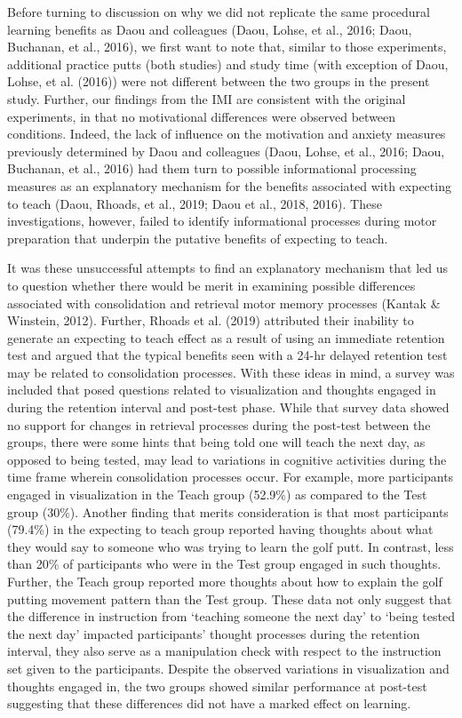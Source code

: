 \documentclass[
  english,
  man,floatsintext]{apa7}
\begin{document}
Before turning to discussion on why we did not replicate the same procedural learning benefits as Daou and colleagues (Daou, Lohse, et al., 2016; Daou, Buchanan, et al., 2016), we first want to note that, similar to those experiments, additional practice putts (both studies) and study time (with exception of Daou, Lohse, et al. (2016)) were not different between the two groups in the present study. Further, our findings from the IMI are consistent with the original experiments, in that no motivational differences were observed between conditions. Indeed, the lack of influence on the motivation and anxiety measures previously determined by Daou and colleagues (Daou, Lohse, et al., 2016; Daou, Buchanan, et al., 2016) had them turn to possible informational processing measures as an explanatory mechanism for the benefits associated with expecting to teach (Daou, Rhoads, et al., 2019; Daou et al., 2018, 2016). These investigations, however, failed to identify informational processes during motor preparation that underpin the putative benefits of expecting to teach.

It was these unsuccessful attempts to find an explanatory mechanism that led us to question whether there would be merit in examining possible differences associated with consolidation and retrieval motor memory processes (Kantak \& Winstein, 2012). Further, Rhoads et al. (2019) attributed their inability to generate an expecting to teach effect as a result of using an immediate retention test and argued that the typical benefits seen with a 24-hr delayed retention test may be related to consolidation processes. With these ideas in mind, a survey was included that posed questions related to visualization and thoughts engaged in during the retention interval and post-test phase. While that survey data showed no support for changes in retrieval processes during the post-test between the groups, there were some hints that being told one will teach the next day, as opposed to being tested, may lead to variations in cognitive activities during the time frame wherein consolidation processes occur. For example, more participants engaged in visualization in the Teach group (52.9\%) as compared to the Test group (30\%). Another finding that merits consideration is that most participants (79.4\%) in the expecting to teach group reported having thoughts about what they would say to someone who was trying to learn the golf putt. In contrast, less than 20\% of participants who were in the Test group engaged in such thoughts. Further, the Teach group reported more thoughts about how to explain the golf putting movement pattern than the Test group. These data not only suggest that the difference in instruction from `teaching someone the next day' to `being tested the next day' impacted participants' thought processes during the retention interval, they also serve as a manipulation check with respect to the instruction set given to the participants. Despite the observed variations in visualization and thoughts engaged in, the two groups showed similar performance at post-test suggesting that these differences did not have a marked effect on learning.
\end{document}
